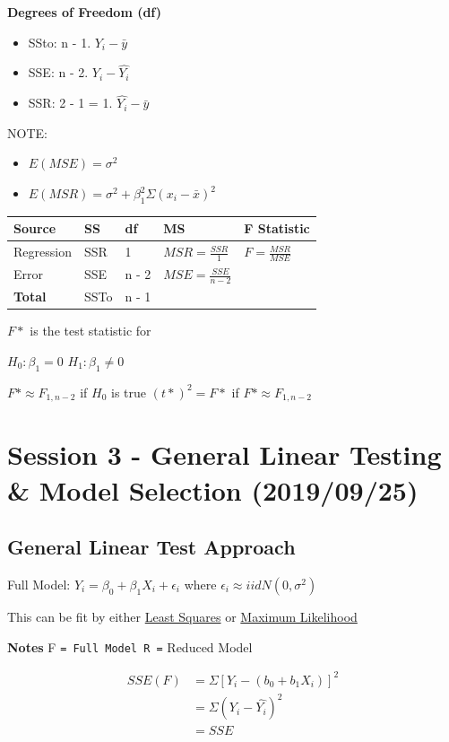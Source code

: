 \documentclass[11pt]{article}
\begin{document}
\textbf{Degrees of Freedom (df)}
\begin{itemize}
\item SSto: n - 1. \(Y_i - \bar{y}\)
\item SSE: n - 2. \(Y_i - \hat{Y_i}\)
\item SSR: 2 - 1 = 1. \(\hat{Y_i} - \bar{y}\)
\end{itemize}


NOTE:
\begin{itemize}
\item \(E(MSE) = \sigma^2\)
\item \(E(MSR) = \sigma^2 + \beta_1^2 \Sigma (x_i - \bar{x})^2\)
\end{itemize}

\begin{center}
\begin{tabular}{lllll}
Source & SS & df & MS & F Statistic\\
\hline
Regression & SSR & 1 & \(MSR = \frac{SSR}{1}\) & \(F = \frac{MSR}{MSE}\)\\
Error & SSE & n - 2 & \(MSE = \frac{SSE}{n - 2}\) & \\
\textbf{Total} & SSTo & n - 1 &  & \\
\end{tabular}
\end{center}

\(F*\) is the test statistic for

\(H_0: \beta_1 = 0\)
\(H_1: \beta_1 \neq 0\)

\(F* \approx F_{1, n-2}\) if \(H_0\) is true
\((t*)^2 = F*\) if \(F* \approx F_{1, n - 2}\)
\section{Session 3 - General Linear Testing \& Model Selection (2019/09/25)}
\label{sec:org5a1e513}
\subsection{General Linear Test Approach}
\label{sec:org98adcfb}

Full Model: \(Y_i = \beta_0 + \beta_1 X_i + \epsilon_i\) where \(\epsilon_i \approx
iid N(0, \sigma^2)\)

This can be fit by either \uline{Least Squares} or \uline{Maximum Likelihood}

\textbf{Notes}
F \texttt{= Full Model
R =} Reduced Model

\begin{equation}
\begin{split}
SSE(F) & = \Sigma [ Y_i - (b_0 + b_1 X_i) ]^2 \\
& = \Sigma{ (Y_i - \hat{Y_i})^2} \\
& = SSE
\end{split}
\end{equation}
\end{document}
